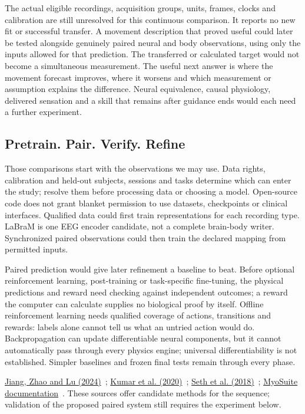 The actual eligible recordings, acquisition groups, units, frames, clocks and calibration are still unresolved for this continuous comparison. It reports no new fit or successful transfer. A movement description that proved useful could later be tested alongside genuinely paired neural and body observations, using only the inputs allowed for that prediction. The transferred or calculated target would not become a simultaneous measurement. The useful next answer is where the movement forecast improves, where it worsens and which measurement or assumption explains the difference. Neural equivalence, causal physiology, delivered sensation and a skill that remains after guidance ends would each need a further experiment.

\subsection{Pretrain. Pair. Verify. Refine}
Those comparisons start with the observations we may use. Data rights,
calibration and held-out subjects, sessions and tasks determine which can
enter the study; resolve them before processing data or choosing a model.
Open-source code does not grant blanket permission to use datasets,
checkpoints or clinical interfaces. Qualified data could first train
representations for each recording type. LaBraM is one EEG encoder candidate,
not a complete brain-body writer. Synchronized paired observations could
then train the declared mapping from permitted inputs.

Paired prediction would give later refinement a baseline to beat. Before
optional reinforcement learning, post-training or task-specific fine-tuning,
the physical predictions and reward need checking against independent
outcomes; a reward the computer can calculate supplies no biological proof
by itself. Offline reinforcement learning needs qualified coverage of actions,
transitions and rewards: labels alone cannot tell us what an untried action
would do. Backpropagation can update differentiable neural components, but
it cannot automatically pass through every physics engine; universal
differentiability is not established. Simpler baselines and frozen final
tests remain through every phase.
\par\noindent \href{https://arxiv.org/html/2405.18765v1}{Jiang, Zhao and Lu (2024)}~\cite{labram2024}; \href{https://arxiv.org/abs/2006.04779v3}{Kumar et al. (2020)}~\cite{cql2020}; \href{https://journals.plos.org/ploscompbiol/article?id=10.1371/journal.pcbi.1006223}{Seth et al. (2018)}~\cite{opensim2018}; \href{https://myosuite.readthedocs.io/en/latest/}{MyoSuite documentation}~\cite{myosuiteDocsUndated}. These sources offer candidate methods for the sequence; validation of the proposed paired system still requires the experiment below.

